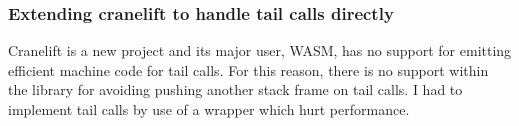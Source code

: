 \subsubsection{Extending cranelift to handle tail calls directly}

Cranelift is a new project and its major user, WASM, has no support for emitting efficient machine
code for tail calls.  For this reason, there is no support within the library for avoiding pushing
another stack frame on tail calls. I had to implement tail calls by use of a wrapper which hurt
performance.